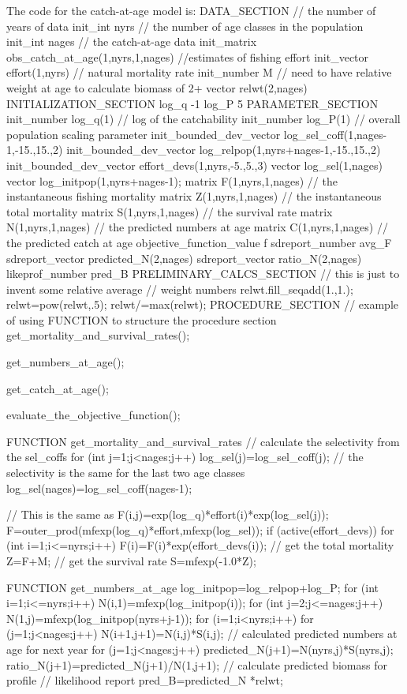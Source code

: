 \documentclass[12pt]{book}
\begin{document}
The code for the catch-at-age model is: 
\beginexample
DATA_SECTION
  // the number of years of data
  init_int nyrs  
  // the number of age classes in the population
  init_int nages
  // the catch-at-age data
  init_matrix obs_catch_at_age(1,nyrs,1,nages)
  //estimates of fishing effort
  init_vector effort(1,nyrs)
  // natural mortality rate
  init_number M
  // need to have relative weight at age to calculate biomass of 2+
  vector relwt(2,nages)
INITIALIZATION_SECTION
  log_q -1 
  log_P 5
PARAMETER_SECTION
  init_number log_q(1)   // log of the catchability
  init_number log_P(1)  // overall population scaling parameter
  init_bounded_dev_vector log_sel_coff(1,nages-1,-15.,15.,2)
  init_bounded_dev_vector log_relpop(1,nyrs+nages-1,-15.,15.,2)
  init_bounded_dev_vector effort_devs(1,nyrs,-5.,5.,3)
  vector log_sel(1,nages)
  vector log_initpop(1,nyrs+nages-1);
  matrix F(1,nyrs,1,nages)   // the instantaneous fishing mortality
  matrix Z(1,nyrs,1,nages)   // the instantaneous total mortality
  matrix S(1,nyrs,1,nages)   // the survival rate
  matrix N(1,nyrs,1,nages)   // the predicted numbers at age
  matrix C(1,nyrs,1,nages)   // the predicted catch at age 
  objective_function_value f
  sdreport_number avg_F
  sdreport_vector predicted_N(2,nages)
  sdreport_vector ratio_N(2,nages)
  likeprof_number pred_B
PRELIMINARY_CALCS_SECTION
  // this is just to invent some relative average
  // weight numbers
  relwt.fill_seqadd(1.,1.);
  relwt=pow(relwt,.5);
  relwt/=max(relwt);
PROCEDURE_SECTION
  // example of using FUNCTION to structure the procedure section
  get_mortality_and_survival_rates();

  get_numbers_at_age();

  get_catch_at_age();

  evaluate_the_objective_function();

FUNCTION get_mortality_and_survival_rates
  // calculate the selectivity from the sel_coffs
  for (int j=1;j<nages;j++)
  {
    log_sel(j)=log_sel_coff(j);
  }
  // the selectivity is the same for the last two age classes
  log_sel(nages)=log_sel_coff(nages-1);

  // This is the same as F(i,j)=exp(log_q)*effort(i)*exp(log_sel(j));
  F=outer_prod(mfexp(log_q)*effort,mfexp(log_sel));
  if (active(effort_devs))
  {
    for (int i=1;i<=nyrs;i++)
    {
      F(i)=F(i)*exp(effort_devs(i));
    }
  }
  // get the total mortality
  Z=F+M;
  // get the survival rate
  S=mfexp(-1.0*Z);

FUNCTION get_numbers_at_age
  log_initpop=log_relpop+log_P;
  for (int i=1;i<=nyrs;i++)
  {
    N(i,1)=mfexp(log_initpop(i));
  }
  for (int j=2;j<=nages;j++)
  {
    N(1,j)=mfexp(log_initpop(nyrs+j-1));
  }
  for (i=1;i<nyrs;i++)
  {
    for (j=1;j<nages;j++)
    {
      N(i+1,j+1)=N(i,j)*S(i,j);
    }
  }
  // calculated predicted numbers at age for next year
  for (j=1;j<nages;j++)
  {
    predicted_N(j+1)=N(nyrs,j)*S(nyrs,j);
    ratio_N(j+1)=predicted_N(j+1)/N(1,j+1);
  }
  // calculate predicted biomass for profile
  // likelihood report
  pred_B=predicted_N *relwt;
\end{document}
